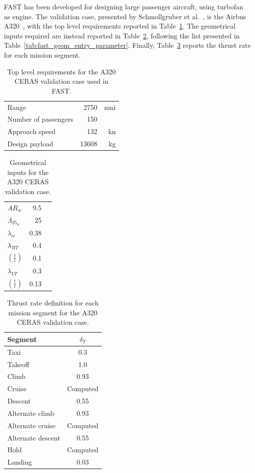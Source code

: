 FAST has been developed for designing large passenger aircraft, using turbofan as engine. 
The validation case, presented by Schmollgruber et al.~\cite{bib:fast_main}, is the Airbus A320~\cite{bib:a320_specifications}, with the top level requirements reported in Table~\ref{tab:fast_base_tlar}.
The geometrical inputs required are instead reported in Table~\ref{tab:fast_base_geom_inp}, following the list presented in Table~\ref{tab:fast_geom_entry_parameter}.
Finally, Table~\ref{tab:fast_base_thrust_rate_entry} reports the thrust rate for each mission segment. 
\begin{table}[!h]
	\centering
	\begin{tabular}{l r r}
		\hline
		Range & 2750 & nmi \\
		Number of passengers & 150 & \\
		Approach speed & 132 & \si{\knot} \\
		Design payload & 13608 & \si{\kilogram} \\
		\hline		
	\end{tabular}
	\caption{Top level requirements for the A320 CERAS validation case used in FAST.}
	\label{tab:fast_base_tlar}
\end{table}
\begin{table}[!h]
	\centering
	\begin{tabular}{l r l}
		\hline
		$AR_w$ & 9.5 & \\
		$\Lambda_{25_{w}}$ & 25 & \si{\deg} \\
		$\lambda_w$ & 0.38 & \\
		$\lambda_{HT}$ & 0.4 & \\
		$\left(\frac{t}{c}\right)$ & 0.1 & \\
		$\lambda_{VT}$ & 0.3 & \\
		$\left(\frac{t}{c}\right)$ & 0.13 & \\
		\hline
	\end{tabular}
	\caption{Geometrical inputs for the A320 CERAS validation case.}
	\label{tab:fast_base_geom_inp}
\end{table}
\begin{table}[!h]
	\centering
	\begin{tabular}{l c}
		\hline
		Segment & $\delta_T$ \\
		\hline
		Taxi & 0.3 \\
		Takeoff & 1.0 \\
		Climb & 0.93 \\
		Cruise & Computed \\
		Descent & 0.55 \\
		Alternate climb & 0.93 \\
		Alternate cruise & Computed \\
		Alternate descent & 0.55 \\
		Hold & Computed \\
		Landing & 0.03 \\
		\hline
	\end{tabular}
	\caption{Thrust rate definition for each mission segment for the A320 CERAS validation case.}
	\label{tab:fast_base_thrust_rate_entry}
\end{table}
